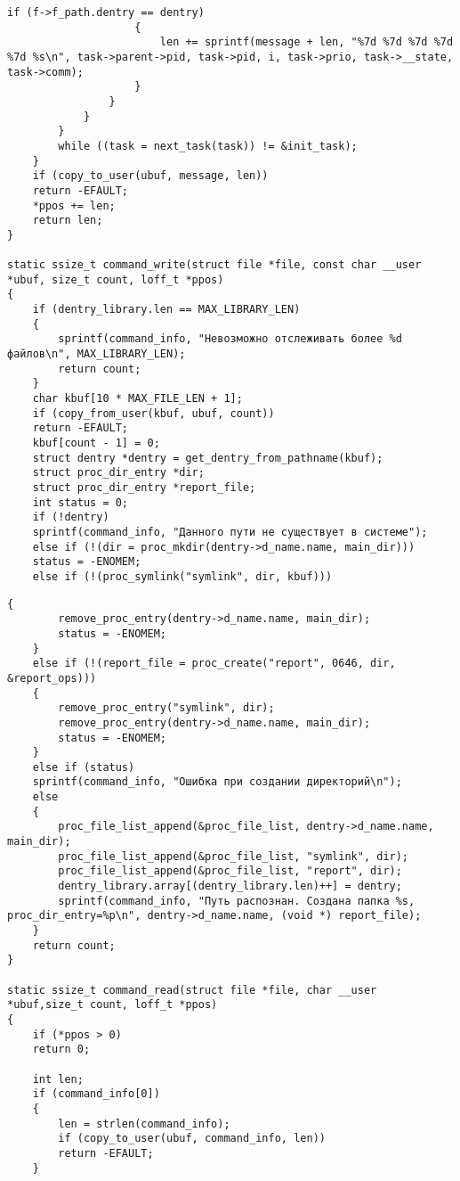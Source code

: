 \begin{center}
\begin{lstlisting}[label=listing_main_c5,caption=Файл main.c]
					if (f->f_path.dentry == dentry)
					{
						len += sprintf(message + len, "%7d %7d %7d %7d %7d %s\n", task->parent->pid, task->pid, i, task->prio, task->__state, task->comm);
					}
				}
			}
		}
		while ((task = next_task(task)) != &init_task);
	}
	if (copy_to_user(ubuf, message, len))
	return -EFAULT;
	*ppos += len;
	return len;
}

static ssize_t command_write(struct file *file, const char __user *ubuf, size_t count, loff_t *ppos) 
{
	if (dentry_library.len == MAX_LIBRARY_LEN)
	{
		sprintf(command_info, "Невозможно отслеживать более %d файлов\n", MAX_LIBRARY_LEN);
		return count;
	}
	char kbuf[10 * MAX_FILE_LEN + 1];
	if (copy_from_user(kbuf, ubuf, count))
	return -EFAULT;
	kbuf[count - 1] = 0;
	struct dentry *dentry = get_dentry_from_pathname(kbuf);
	struct proc_dir_entry *dir;
	struct proc_dir_entry *report_file;
	int status = 0;
	if (!dentry)
	sprintf(command_info, "Данного пути не существует в системе");
	else if (!(dir = proc_mkdir(dentry->d_name.name, main_dir)))
	status = -ENOMEM;
	else if (!(proc_symlink("symlink", dir, kbuf)))
	\end{lstlisting}
\end{center}

\begin{center}
\begin{lstlisting}[label=listing_main_c6,caption=Файл main.c]
	{
		remove_proc_entry(dentry->d_name.name, main_dir);
		status = -ENOMEM;
	}
	else if (!(report_file = proc_create("report", 0646, dir, &report_ops)))
	{
		remove_proc_entry("symlink", dir);
		remove_proc_entry(dentry->d_name.name, main_dir);
		status = -ENOMEM;
	}
	else if (status)
	sprintf(command_info, "Ошибка при создании директорий\n");
	else
	{
		proc_file_list_append(&proc_file_list, dentry->d_name.name, main_dir);
		proc_file_list_append(&proc_file_list, "symlink", dir);
		proc_file_list_append(&proc_file_list, "report", dir);
		dentry_library.array[(dentry_library.len)++] = dentry;
		sprintf(command_info, "Путь распознан. Создана папка %s, proc_dir_entry=%p\n", dentry->d_name.name, (void *) report_file);
	}
	return count;
}

static ssize_t command_read(struct file *file, char __user *ubuf,size_t count, loff_t *ppos) 
{
	if (*ppos > 0)
	return 0;
	
	int len;
	if (command_info[0])
	{
		len = strlen(command_info);
		if (copy_to_user(ubuf, command_info, len))
		return -EFAULT;
	}
	\end{lstlisting}
\end{center}

